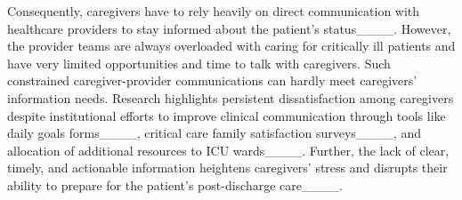 
Consequently, caregivers have to rely heavily on direct communication with healthcare providers to stay informed about the patient’s status____. 
However, the provider teams are always overloaded with caring for critically ill patients and have very limited opportunities and time to talk with caregivers.
Such constrained caregiver-provider communications can hardly meet caregivers' information needs.
Research highlights persistent dissatisfaction among caregivers despite institutional efforts to improve clinical communication through tools like daily goals forms____, critical care family satisfaction surveys____, and allocation of additional resources to ICU wards____. 
Further, the lack of clear, timely, and actionable information heightens caregivers' stress and disrupts their ability to prepare for the patient’s post-discharge care____.

